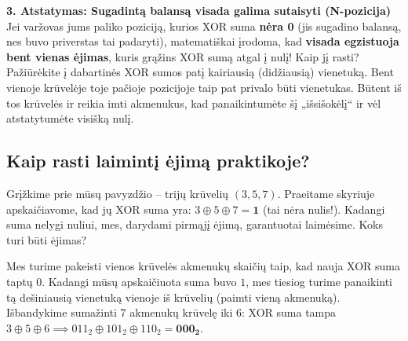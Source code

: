 \documentclass[11pt,a4paper]{scrartcl}
\begin{document}
\textbf{3. Atstatymas: Sugadintą balansą visada galima sutaisyti (N-pozicija)}
Jei varžovas jums paliko poziciją, kurios XOR suma \textbf{nėra 0} (jis sugadino balansą, nes buvo priverstas tai padaryti), matematiškai įrodoma, kad \textbf{visada egzistuoja bent vienas ėjimas}, kuris grąžins XOR sumą atgal į nulį!
Kaip jį rasti? Pažiūrėkite į dabartinės XOR sumos patį kairiausią (didžiausią) vienetuką. Bent vienoje krūvelėje toje pačioje pozicijoje taip pat privalo būti vienetukas. Būtent iš tos krūvelės ir reikia imti akmenukus, kad panaikintumėte šį „išsišokėlį“ ir vėl atstatytumėte visišką nulį.

\begin{center}
\end{center}

\subsection*{Kaip rasti laimintį ėjimą praktikoje?}
Grįžkime prie mūsų pavyzdžio – trijų krūvelių $(3, 5, 7)$. Praeitame skyriuje apskaičiavome, kad jų XOR suma yra: $3 \oplus 5 \oplus 7 = \mathbf{1}$ (tai nėra nulis!). Kadangi suma nelygi nuliui, mes, darydami pirmąjį ėjimą, garantuotai laimėsime. Koks turi būti ėjimas? 

Mes turime pakeisti vienos krūvelės akmenukų skaičių taip, kad nauja XOR suma taptų $0$. 
Kadangi mūsų apskaičiuota suma buvo $1$, mes tiesiog turime panaikinti tą dešiniausią vienetuką vienoje iš krūvelių (paimti vieną akmenuką).
Išbandykime sumažinti 7 akmenukų krūvelę iki 6:
XOR suma tampa $3 \oplus 5 \oplus 6 \implies 011_2 \oplus 101_2 \oplus 110_2 = \mathbf{000_2}$. 
\end{document}
